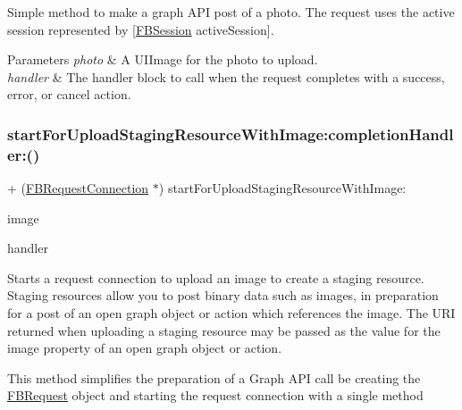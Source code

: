 Simple method to make a graph A\+PI post of a photo. The request uses the active session represented by {\ttfamily \mbox{[}\hyperlink{interfaceFBSession}{F\+B\+Session} active\+Session\mbox{]}}.


\begin{DoxyParams}{Parameters}
{\em photo} & A {\ttfamily U\+I\+Image} for the photo to upload. \\
\hline
{\em handler} & The handler block to call when the request completes with a success, error, or cancel action. \\
\hline
\end{DoxyParams}
\mbox{\label{interfaceFBRequestConnection_a930bc2fc6bfff73c3d98d15e6c84a5f9}} 
\subsubsection{\texorpdfstring{start\+For\+Upload\+Staging\+Resource\+With\+Image\+:completion\+Handler\+:()}{startForUploadStagingResourceWithImage:completionHandler:()}\hspace{0.1cm}{\footnotesize\ttfamily [1/5]}}
{\footnotesize\ttfamily + (\hyperlink{interfaceFBRequestConnection}{F\+B\+Request\+Connection} $\ast$) start\+For\+Upload\+Staging\+Resource\+With\+Image\+: \begin{DoxyParamCaption}\item[{(U\+I\+Image $\ast$)}]{image }\item[{completionHandler:(F\+B\+Request\+Handler)}]{handler }\end{DoxyParamCaption}}

Starts a request connection to upload an image to create a staging resource. Staging resources allow you to post binary data such as images, in preparation for a post of an open graph object or action which references the image. The U\+RI returned when uploading a staging resource may be passed as the value for the image property of an open graph object or action.

This method simplifies the preparation of a Graph A\+PI call be creating the \hyperlink{interfaceFBRequest}{F\+B\+Request} object and starting the request connection with a single method


